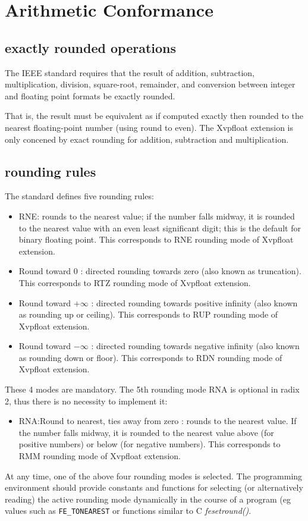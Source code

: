 \section{Arithmetic Conformance}

\subsection{exactly rounded operations}
The IEEE standard requires that the result of addition, subtraction, multiplication, division, square-root, remainder, and conversion between integer and floating point formats be exactly rounded.


That is, the result must be equivalent as if computed exactly then rounded to the nearest floating-point number (using round to even). The Xvpfloat extension is only concened by exact rounding for addition, subtraction and multiplication.

\subsection{rounding rules}
The standard defines five rounding rules:
\begin{itemize}[topsep=0pt]
\item RNE: rounds to the nearest value; if the number falls midway, it is rounded to the nearest value with an even least significant digit; this is the default for binary floating point.
This corresponds to RNE rounding mode of Xvpfloat extension.
\item Round toward 0 : directed rounding towards zero (also known as truncation).
This corresponds to RTZ rounding mode of Xvpfloat extension.
\item Round toward $+\infty$  : directed rounding towards positive infinity (also known as rounding up or ceiling).
This corresponds to RUP rounding mode of Xvpfloat extension.
\item Round toward $-\infty$  : directed rounding towards negative infinity (also known as rounding down or floor).
This corresponds to RDN rounding mode of Xvpfloat extension.
\end{itemize}
These 4 modes are mandatory. The 5th rounding mode RNA is optional in radix 2, thus there is no necessity to implement it:
\begin{itemize}[topsep=0pt]
\item RNA:Round to nearest, ties away from zero : rounds to the nearest value. If the number falls midway, it is rounded to the nearest value above (for positive numbers) or below (for negative numbers).
This corresponds to RMM rounding mode of Xvpfloat extension.
\end{itemize}
At any time, one of the above four rounding modes is selected.
The programming environment should provide constants and functions for selecting (or alternatively reading) the active rounding mode dynamically in the course of a program (eg values such as \texttt{FE\_TONEAREST} or functions similar to C \emph{fesetround()}.

